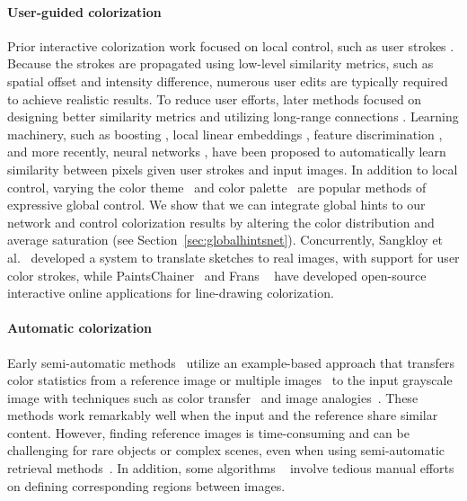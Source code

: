 \documentclass[acmtog,authorversion]{acmart}
\begin{document}
\paragraph{User-guided colorization} Prior interactive colorization work focused on local control, such as user strokes \cite{levin2004colorization,huang2005adaptive}. Because the strokes are propagated using low-level similarity metrics, such as spatial offset and intensity difference, numerous user edits are typically required to achieve realistic results. To reduce user efforts, later methods focused on designing better similarity metrics \cite{qu2006manga,luan2007natural} and utilizing long-range connections \cite{an2008appprop,xu2009efficient}. Learning machinery, such as boosting \cite{li2008scribbleboost}, local linear embeddings \cite{chen2012manifold}, feature discrimination \cite{xu2013sparse}, and more recently, neural networks \cite{endo2016deepprop}, have been proposed to automatically learn similarity between pixels given user strokes and input images. In addition to local control, varying the color theme~\cite{wang2010data,li2015image} and color palette~\cite{chang2015palette} are popular methods of expressive global control. We show that we can integrate global hints to our network and control colorization results by altering the color distribution and average saturation (see Section~\ref{sec:globalhintsnet}). Concurrently, Sangkloy et al.~ developed a system to translate sketches to real images, with support for user color strokes, while PaintsChainer~ and Frans ~ have developed open-source interactive online applications for line-drawing colorization. 

\paragraph{Automatic colorization} 
Early semi-automatic methods~\cite{welsh2002transferring,irony2005colorization,liu2008intrinsic,chia2011semantic,gupta2012image} utilize an example-based approach that transfers color statistics from a reference image or multiple images~\cite{morimoto2009automatic,liu2014autostyle} to the input grayscale image with techniques such as color transfer~\cite{Reinhard2001color} and image analogies~\cite{hertzmann2001image}. These methods work remarkably well when the input and the reference share similar content. However, finding reference images is time-consuming and can be challenging for rare objects or complex scenes, even when using semi-automatic retrieval methods~\cite{chia2011semantic}. In addition, some algorithms ~\cite{irony2005colorization,chia2011semantic} involve tedious manual efforts on defining corresponding regions between images.
\end{document}
